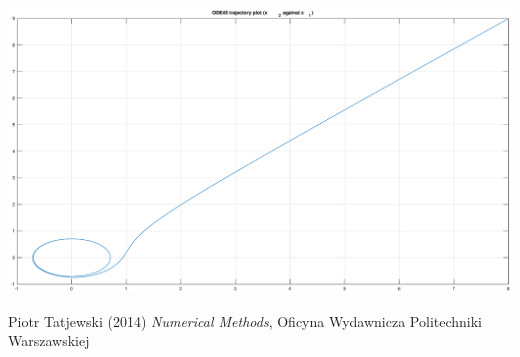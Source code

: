 \documentclass[12pt]{report}
\begin{document}
\begin{center}
   \includegraphics[scale=0.25]{29.eps}
\end{center}


\begin{thebibliography}{9}
Piotr Tatjewski (2014) \emph{Numerical Methods}, Oficyna Wydawnicza Politechniki Warszawskiej
\end{thebibliography}
\end{document}
